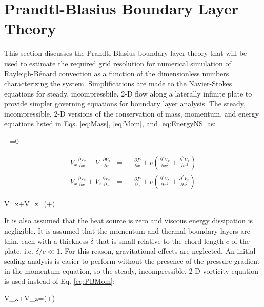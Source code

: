 \documentclass[10pt]{article}
\numberwithin{equation}{section} %
\begin{document}
\clearpage
\section{Prandtl-Blasius Boundary Layer Theory}
\label{sec:PBL}

This section discusses the Prandtl-Blasius boundary layer theory that will be used to estimate the required grid resolution for numerical simulation of Rayleigh-B\'enard convection as a function of the dimensionless numbers characterizing the system. Simplifications are made to the Navier-Stokes equations for steady, incompressbile, 2-D flow along a laterally infinite plate to provide simpler governing equations for boundary layer analysis. The steady, incompressible, 2-D versions of the conservation of mass, momentum, and energy equations listed in Eqs. \eqref{eq:Mass}, \eqref{eq:Mom}, and \eqref{eq:EnergyNS} as:

\beq
{}+=0
\eeq

\begin{subequations}
\label{eq:PBMom}
\begin{eqnarray}
V_x\frac{\partial V_x}{\partial x}+V_z\frac{\partial V_x}{\partial z}&=&-\frac{\partial P}{\partial x}+\nu\left(\frac{\partial^2V_x}{\partial x^2}+\frac{\partial^2V_x}{\partial z^2}\right)\\
V_x\frac{\partial V_z}{\partial x}+V_z\frac{\partial V_z}{\partial z}&=&-\frac{\partial P}{\partial z}+\nu\left(\frac{\partial^2V_z}{\partial x^2}+\frac{\partial^2V_z}{\partial z^2}\right)
\end{eqnarray}
\end{subequations}

\beq
\label{eq:PBEnergy}
V_x+V_z=\kappa\left(+\right)
\eeq

It is also assumed that the heat source is zero and viscous energy dissipation is negligible. It is assumed that the momentum and thermal boundary layers are thin, each with a thickness \(\delta\) that is small relative to the chord length \(c\) of the plate, i.e. \(\delta/c\ll1\). For this reason, gravitational effects are neglected. An initial scaling analysis is easier to perform without the presence of the pressure gradient in the momentum equation, so the steady, incompressible, 2-D vorticity equation is used instead of Eq. \eqref{eq:PBMom}:

\beq
V_x+V_z=\nu\left(+\right)
\eeq
\end{document}
